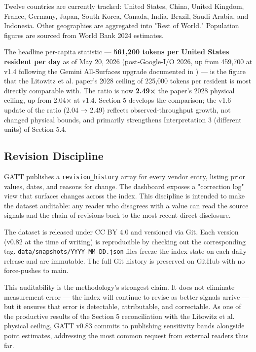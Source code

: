 \documentclass[11pt,a4paper]{article}
\begin{document}
Twelve countries are currently tracked: United States, China, United Kingdom, France, Germany, Japan, South Korea, Canada, India, Brazil, Saudi Arabia, and Indonesia. Other geographies are aggregated into "Rest of World." Population figures are sourced from World Bank 2024 estimates.

The headline per-capita statistic --- \textbf{561,200 tokens per United States resident per day} as of May 20, 2026 (post-Google-I/O 2026, up from 459,700 at v1.4 following the Gemini All-Surfaces upgrade documented in \cite{pichai2026io}) --- is the figure that the Litowitz et al. paper's 2028 ceiling of 225,000 tokens per resident is most directly comparable with. The ratio is now \textbf{2.49×} the paper's 2028 physical ceiling, up from 2.04× at v1.4. Section 5 develops the comparison; the v1.6 update of the ratio (2.04 → 2.49) reflects observed-throughput growth, not changed physical bounds, and primarily strengthens Interpretation 3 (different units) of Section 5.4.

\subsection{Revision Discipline}

GATT publishes a \texttt{revision\_history} array for every vendor entry, listing prior values, dates, and reasons for change. The dashboard exposes a "correction log" view that surfaces changes across the index. This discipline is intended to make the dataset auditable: any reader who disagrees with a value can read the source signals and the chain of revisions back to the most recent direct disclosure.

The dataset is released under CC BY 4.0 and versioned via Git. Each version (v0.82 at the time of writing) is reproducible by checking out the corresponding tag. \texttt{data/snapshots/YYYY-MM-DD.json} files freeze the index state on each daily release and are immutable. The full Git history is preserved on GitHub with no force-pushes to main.

This auditability is the methodology's strongest claim. It does not eliminate measurement error --- the index will continue to revise as better signals arrive --- but it ensures that error is detectable, attributable, and correctable. As one of the productive results of the Section 5 reconciliation with the Litowitz et al. physical ceiling, GATT v0.83 commits to publishing sensitivity bands alongside point estimates, addressing the most common request from external readers thus far.
\end{document}
